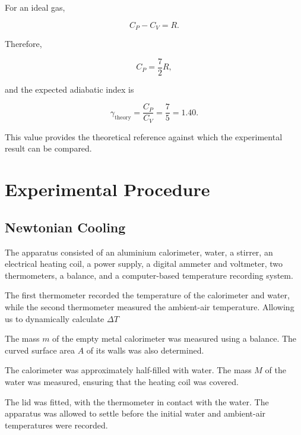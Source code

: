 \documentclass[12pt,a4paper]{article}
\begin{document}
For an ideal gas,

\begin{equation}
    C_P-C_V=R.
\end{equation}

Therefore,

\begin{equation}
    C_P=\frac{7}{2}R,
\end{equation}

and the expected adiabatic index is

\begin{equation}
    \boxed{
    \gamma_{\mathrm{theory}}
    =\frac{C_P}{C_V}
    =\frac{7}{5}=1.40
    }.
\end{equation}

This value provides the theoretical reference against which
the experimental result can be compared.

\newpage

\section{Experimental Procedure}

\subsection{Newtonian Cooling}

The apparatus consisted of an aluminium calorimeter, water, a
stirrer, an electrical heating coil, a power supply, a digital
ammeter and voltmeter, two thermometers, a balance, and a
computer-based temperature recording system.

The first thermometer recorded the temperature of the
calorimeter and water, while the second thermometer measured the
ambient-air temperature. Allowing us to dynamically calculate $\Delta T$

The mass $m$ of the empty metal calorimeter was measured
using a balance. The curved surface area $A$ of its walls was
also determined.

The calorimeter was approximately half-filled with water.
The mass $M$ of the water was measured, ensuring that the
heating coil was covered.

The lid was fitted, with the thermometer in contact with
the water. The apparatus was allowed to settle before the
initial water and ambient-air temperatures were recorded.
\end{document}
